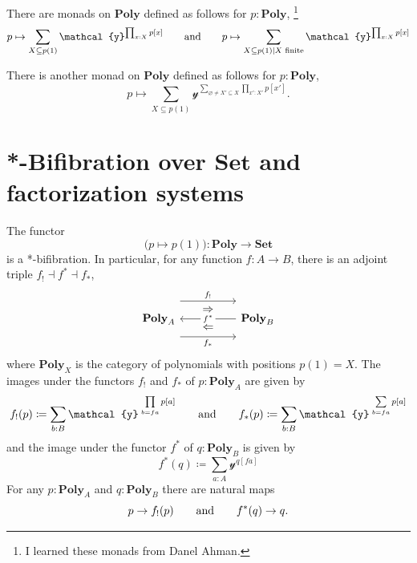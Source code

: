 \documentclass[11pt, one side, article]{memoir}
\theoremstyle{definition}
\theoremstyle{plain}
\renewcommand{\ss}{\subseteq}
\newcommand{\Cat}[1]{\mathbf{#1}}%
\newcommand{\tn}[1]{\textnormal{#1}}
\newcommand{\smset}{\Cat{Set}}
\newcommand{\yon}{{\mathcal{y}}}
\newcommand{\poly}{\Cat{Poly}}
\newcommand{\0}{\textsf{0}}
\newcommand{\1}{\tn{\textsf{1}}}
\newcommand{\hh}[2][]{#1 \tn{#2} #1}
\newcommand{\qqand}{\hh[\qquad]{and}}
\begin{document}
There are monads on $\poly$ defined as follows for $p:\poly$,%
\footnote{I learned these monads from Danel Ahman.}
\begin{equation}
	p\mapsto\sum_{X\ss p(1)}\yon^{\prod_{x:X}p[x]}
	\qqand
	p\mapsto\sum_{X\ss p(1) | X \tn{ finite}}\yon^{\prod_{x:X}p[x]}
\end{equation}

There is another monad on $\poly$ defined as follows for $p:\poly$,
\begin{equation}
	p\mapsto\sum_{X\ss p(1)}\yon^{\sum_{\varnothing\neq X'\ss X}\prod_{x':X'}p[x']}.
\end{equation}


\chapter{*-Bifibration over $\smset$ and factorization systems}\label{chap.bifib}

The functor
\begin{equation}\label{eqn.bifib}
\big(p\mapsto p(1)\big)\colon\poly\to\smset
\end{equation}
is a *-bifibration. In particular, for any function $f\colon A\to B$, there is an adjoint triple $f_!\dashv f^*\dashv f_*$,
\begin{equation}
\begin{tikzcd}[column sep=50pt]
	\poly_A
		\ar[r, shift left=16pt, "f_!"]
		\ar[r, shift right=16pt, "f_*"']
		\ar[from=r, "f^*" description]
		\ar[r, phantom, shift left=8pt, "\Rightarrow"]
		\ar[r, phantom, shift right=8pt, "\Leftarrow"]
	&
	\poly_B
\end{tikzcd}
\end{equation}
where $\poly_X$ is the category of polynomials with positions $p(1)=X$. The images under the functors $f_!$ and $f_*$ of $p:\poly_A$ are given by
\begin{equation}
	f_!(p)\coloneqq\sum_{b: B}\yon^{\;\prod\limits_{b=fa}p[a]}
	\qqand
	f_*(p)\coloneqq\sum_{b: B}\yon^{\;\sum\limits_{b=fa}p[a]}
\end{equation}
and the image under the functor $f^*$ of $q:\poly_B$ is given by
\begin{equation}
	f^*(q)\coloneqq\sum_{a: A}\yon^{q[fa]}
\end{equation}
For any $p:\poly_A$ and $q:\poly_B$ there are natural maps
\begin{equation}
	p\to f_!(p)
	\qqand
	f^*(q)\to q.
\end{equation}
\end{document}
